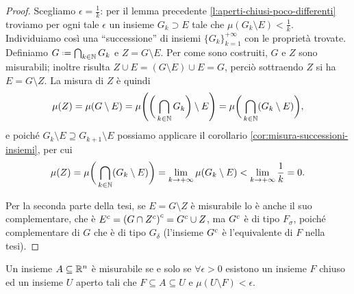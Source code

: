 \begin{proof}
	Scegliamo $\epsilon=\frac1{k}$: per il lemma precedente \ref{l:aperti-chiusi-poco-differenti} troviamo per ogni tale $\epsilon$ un insieme $G_k\supset E$ tale che $\mu(G_k\setminus E)<\frac1{k}$.
	Individuiamo cos\`i una ``successione'' di insiemi $\{G_k\}_{k=1}^{+\infty}$ con le proprietà trovate.
	Definiamo $G\defeq\bigcap_{k\in\N}G_k$ e $Z=G\setminus E$.
	Per come sono costruiti, $G$ e $Z$ sono misurabili; inoltre risulta $Z\cup E=(G\setminus E)\cup E=G$, perciò sottraendo $Z$ si ha $E=G\setminus Z$.
	La misura di $Z$ è quindi
	\begin{equation}
		\mu(Z)=\mu(G\setminus E)=\mu\Bigg(\bigg(\bigcap_{k\in\mathbb{N}}G_k\bigg)\setminus E\Bigg)=\mu\bigg(\bigcap_{k\in\mathbb{N}}(G_k\setminus E)\bigg),
	\end{equation}
	e poich\'e $G_k\setminus E\supseteq G_{k+1}\setminus E$ possiamo applicare il corollario \ref{cor:misura-successioni-insiemi}, per cui	
	\begin{equation}
		\mu(Z)=\mu\bigg(\bigcap_{k\in\mathbb{N}}(G_k\setminus E)\bigg)=\lim_{k\to+\infty}\mu(G_k\setminus E)<\lim_{k\to+\infty}\frac1{k}=0.
	\end{equation}

	Per la seconda parte della tesi, se $E=G\setminus Z$ è misurabile lo è anche il suo complementare, che è ${E}^c={(G\cap{Z}^c)}^c={G}^c\cup Z$, ma ${G}^c$ è di tipo $F_\sigma$, poich\'e complementare di $G$ che è di tipo $G_\delta$ (l'insieme ${G}^c$ è l'equivalente di $F$ nella tesi).
\end{proof}
\begin{teorema}
	Un insieme $A\subseteq\mathbb{R}^n$ è misurabile se e solo se $\forall\epsilon>0$ esistono un insieme $F$ chiuso ed un insieme $U$ aperto tali che $F\subseteq A\subseteq U$ e $\mu(U\setminus F)<\epsilon$.
\end{teorema}
